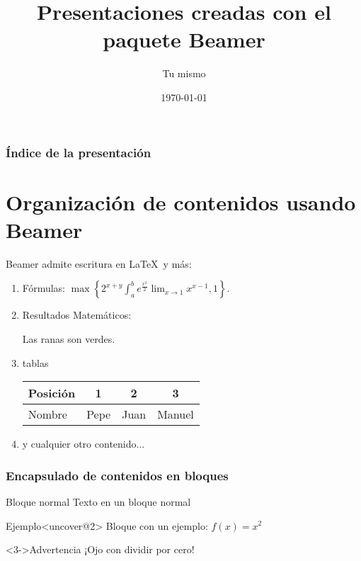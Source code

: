 \documentclass{beamer}
\title{Presentaciones creadas con el paquete Beamer}
\author{Tu mismo}
\date{\today}
\begin{document}
%
\begin{frame}
\titlepage
\end{frame}
%
\begin{frame}
\frametitle{Índice de la presentación}
\tableofcontents
\end{frame}
%
\section{Organización de contenidos usando Beamer}
%
%
\begin{frame}{Beamer admite escritura en \LaTeX\ y más:}
\begin{enumerate}
\item Fórmulas: 
$\max\left\{2^{x+y}\int_a^b e^{\frac{x^2}{2}}\lim_{x\to 1}x^{x-1},1\right\}.$
\item Resultados Matemáticos:
\begin{theorem}\label{tonto}
Las ranas son verdes.
\end{theorem}
\item tablas
\begin{tabular}{|l|c|c|c|} \hline
Posición & 1 & 2 & 3 \\ \hline \hline
Nombre & Pepe & Juan & Manuel\\ \hline
\end{tabular}
\item y cualquier otro contenido...
\end{enumerate}
\end{frame}
\begin{frame}
\frametitle{Encapsulado de contenidos en bloques}
\begin{block}{Bloque normal}
Texto en un bloque normal
\end{block}
%
\begin{exampleblock}{Ejemplo}<uncover@2>
Bloque con un ejemplo: $f(x) = x^2$
\end{exampleblock}
%
\begin{alertblock}<3->{Advertencia}
¡Ojo con dividir por cero!
\end{alertblock}
\end{frame}
\end{document}
